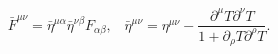 \begin{equation}\label{trans}
{\bar F^{\mu\nu}} = {\bar \eta^{\mu\alpha}}{\bar \eta^{\nu\beta}}
F_{\alpha\beta},\;\;\;
{\bar \eta}^{\mu\nu} = \eta^{\mu\nu} - \frac{\partial^{\mu}T\partial^{\nu}T}
{1 + \partial_{\rho}T\partial^{\rho}T}.
\end{equation}

